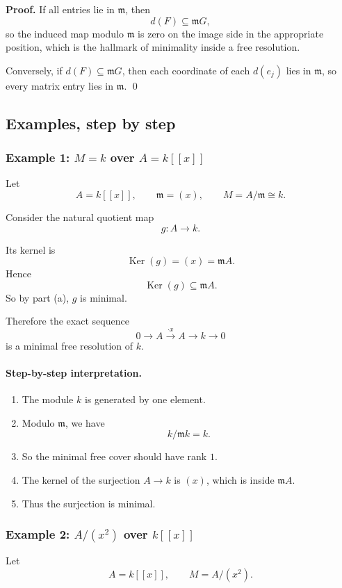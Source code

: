 \documentclass[12pt,a4paper]{article}
\theoremstyle{notespace}
\DeclareMathOperator{\Ker}{Ker}
\newcommand{\m}{\mathfrak m}
\begin{document}
\textbf{Proof.}
If all entries lie in \(\m\), then
\[
d(F)\subseteq \m G,
\]
so the induced map modulo \(\m\) is zero on the image side in the appropriate position, which is the hallmark of minimality inside a free resolution.

Conversely, if \(d(F)\subseteq \m G\), then each coordinate of each \(d(e_j)\) lies in \(\m\), so every matrix entry lies in \(\m\). \qed

\subsection{Examples, step by step}

\subsubsection{Example 1: \(M=k\) over \(A=k[[x]]\)}

Let
\[
A=k[[x]],\qquad \m=(x),\qquad M=A/\m\cong k.
\]

Consider the natural quotient map
\[
g:A\to k.
\]

Its kernel is
\[
\Ker(g)=(x)=\m A.
\]
Hence
\[
\Ker(g)\subseteq \m A.
\]
So by part (a), \(g\) is minimal.

Therefore the exact sequence
\[
0\to A \xrightarrow{\cdot x} A \to k \to 0
\]
is a minimal free resolution of \(k\).

\paragraph{Step-by-step interpretation.}

\begin{enumerate}[leftmargin=2em]
	\item The module \(k\) is generated by one element.
	\item Modulo \(\m\), we have
	\[
	k/\m k = k.
	\]
	\item So the minimal free cover should have rank \(1\).
	\item The kernel of the surjection \(A\to k\) is \((x)\), which is inside \(\m A\).
	\item Thus the surjection is minimal.
\end{enumerate}

\subsubsection{Example 2: \(A/(x^2)\) over \(k[[x]]\)}

Let
\[
A=k[[x]],\qquad M=A/(x^2).
\]
\end{document}
